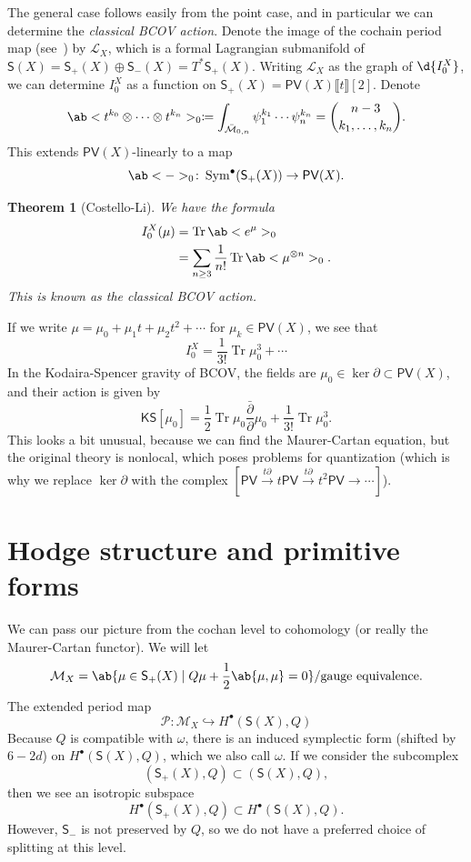 \documentclass{amsart}
\newtheorem{thm}{Theorem}[section]
\theoremstyle{definition}
\theoremstyle{remark}
\theoremstyle{plain}
\theoremstyle{definition}
\theoremstyle{remark}
\newcommand{\M}{\mathcal{M}}
\newcommand{\mc}[1]{\mathcal{#1}}
\newcommand{\on}[1]{\operatorname{#1}}
\newcommand{\ms}[1]{\mathsf{#1}}
\newcommand{\1}{\mathbf{1}}
\newcommand{\2}{\mathbf{2}}
\newcommand{\3}{\mathbf{3}}
\newcommand{\ps}[1]{\lBrack #1 \rBrack}
\newcommand{\dbar}{\bar{\partial}}
\begin{document}
The general case follows easily from the point case, and in particular we can determine the \textit{classical BCOV action}. Denote the image of the cochain period map (see~) by \(\mc{L}_X\), which is a formal Lagrangian submanifold of \(\ms{S}(X) = \ms{S}_+(X) \oplus \ms{S}_-(X) = T^* \ms{S}_+(X)\). Writing \(\mc{L}_X\) as the graph of \(\d{I_0^X}\), we can determine \(I_0^X\) as a function on \(\ms{S}_+(X) = \ms{PV}(X) \ps{t}[2]\). Denote
\[ \ab< t^{k_0} \otimes \cdots \otimes t^{k_n}>_0 \coloneqq \int_{\bar{\M}_{0,n}} \psi_1^{k_1} \cdots \psi_n^{k_n} = \binom{n-3}{k_1, \ldots, k_n}. \]
This extends \(\ms{PV}(X)\)-linearly to a map
\[ \ab<->_0 \colon \on{Sym}^{\bullet} (\ms{S}_+(X)) \to \ms{PV}(X). \]

\begin{thm}[Costello-Li]
    We have the formula
    \begin{align*}
        I_0^X(\mu) &= \on{Tr} \ab<e^{\mu}>_0 \\
        &= \sum_{n \geq 3} \frac{1}{n!} \on{Tr} \ab<\mu^{\otimes n}>_0.
    \end{align*}
    This is known as the \textit{classical BCOV action}.
\end{thm}

If we write \(\mu = \mu_0 + \mu_1 t + \mu_2 t^2 + \cdots \) for \(\mu_k \in \ms{PV}(X)\), we see that 
\[ I_0^X = \frac{1}{3!} \on{Tr} \mu_0^3 + \cdots \]
In the Kodaira-Spencer gravity of BCOV, the fields are \(\mu_0 \in \ker \partial \subset \ms{PV}(X)\), and their action is given by
\[ \ms{KS}[\mu_0] = \frac{1}{2} \on{Tr} \mu_0 \frac{\dbar}{\partial} \mu_0 + \frac{1}{3!} \on{Tr} \mu_0^3. \]
This looks a bit unusual, because we can find the Maurer-Cartan equation, but the original theory is nonlocal, which poses problems for quantization (which is why we replace \(\ker \partial\) with the complex \([\ms{PV} \xrightarrow{t \partial} t \ms{PV} \xrightarrow{t \partial} t^2 \ms{PV} \to \cdots]\)).



\section{Hodge structure and primitive forms}%
\label{sec:Hodge structure and primitive forms}

We can pass our picture from the cochan level to cohomology (or really the Maurer-Cartan functor). We will let
\[ \mc{M}_X = \ab\{ \mu \in \ms{S}_+(X) \mid Q \mu + \frac{1}{2} \ab\{ \mu, \mu \} = 0 \} / \text{gauge equivalence}. \]
The extended period map
\[ \mc{P} \colon \mc{M}_X \hookrightarrow H^{\bullet}(\ms{S}(X), Q) \]
Because \(Q\) is compatible with \(\omega\), there is an induced symplectic form (shifted by \(6-2d\)) on \(H^{\bullet}(\ms{S}(X), Q)\), which we also call \(\omega\). If we consider the subcomplex
\[ (\ms{S}_+(X), Q) \subset (\ms{S}(X), Q), \]
then we see an isotropic subspace
\[ H^{\bullet}(\ms{S}_+(X), Q) \subset H^{\bullet}(\ms{S}(X), Q). \]
However, \(\ms{S}_-\) is not preserved by \(Q\), so we do not have a preferred choice of splitting at this level.
\end{document}

